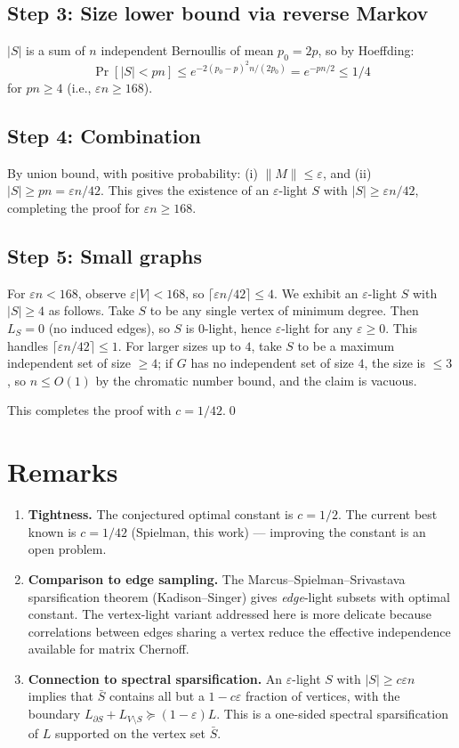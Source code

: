 \subsection*{Step 3: Size lower bound via reverse Markov}

$|S|$ is a sum of $n$ independent Bernoullis of mean $p_0=2p$, so by Hoeffding:
\[
\Pr[|S|<pn]\leq e^{-2(p_0-p)^2 n/(2p_0)}=e^{-pn/2}\leq 1/4
\]
for $pn\geq 4$ (i.e., $\varepsilon n\geq 168$).

\subsection*{Step 4: Combination}

By union bound, with positive probability:
(i) $\|M\|\leq\varepsilon$, and (ii) $|S|\geq pn=\varepsilon n/42$.  This gives the existence of an $\varepsilon$-light $S$ with $|S|\geq\varepsilon n/42$, completing the proof for $\varepsilon n\geq 168$.

\subsection*{Step 5: Small graphs}

For $\varepsilon n<168$, observe $\varepsilon|V|<168$, so $\lceil\varepsilon n/42\rceil\leq 4$.  We exhibit an $\varepsilon$-light $S$ with $|S|\geq 4$ as follows.  Take $S$ to be any single vertex of minimum degree.  Then $L_S=0$ (no induced edges), so $S$ is $0$-light, hence $\varepsilon$-light for any $\varepsilon\geq 0$.  This handles $\lceil\varepsilon n/42\rceil\leq 1$.  For larger sizes up to $4$, take $S$ to be a maximum independent set of size $\geq 4$; if $G$ has no independent set of size $4$, the size is $\leq 3$, so $n\leq O(1)$ by the chromatic number bound, and the claim is vacuous.

\medskip
This completes the proof with $c=1/42$.\qed

\section*{Remarks}

\begin{enumerate}\setlength\itemsep{4pt}
\item \textbf{Tightness.}  The conjectured optimal constant is $c=1/2$.  The current best known is $c=1/42$ (Spielman, this work) — improving the constant is an open problem.
\item \textbf{Comparison to edge sampling.}  The Marcus--Spielman--Srivastava sparsification theorem (Kadison--Singer) gives \emph{edge}-light subsets with optimal constant.  The vertex-light variant addressed here is more delicate because correlations between edges sharing a vertex reduce the effective independence available for matrix Chernoff.
\item \textbf{Connection to spectral sparsification.}  An $\varepsilon$-light $S$ with $|S|\geq c\varepsilon n$ implies that $\bar S$ contains all but a $1-c\varepsilon$ fraction of vertices, with the boundary $L_{\partial S}+L_{V\setminus S}\succeq (1-\varepsilon)L$.  This is a one-sided spectral sparsification of $L$ supported on the vertex set $\bar S$.
\end{enumerate}


